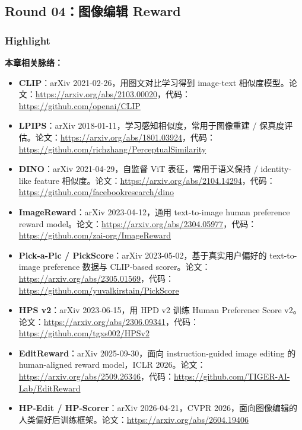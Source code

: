 
\subsection{Round 04：图像编辑 Reward}

\subsubsection{Highlight}

\begin{conceptbox}
\textbf{本章相关脉络：}
\begin{itemize}[leftmargin=1.5em]
  \item \textbf{CLIP}：arXiv 2021-02-26，用图文对比学习得到 image-text 相似度模型。论文：\url{https://arxiv.org/abs/2103.00020}，代码：\url{https://github.com/openai/CLIP}
  \item \textbf{LPIPS}：arXiv 2018-01-11，学习感知相似度，常用于图像重建 / 保真度评估。论文：\url{https://arxiv.org/abs/1801.03924}，代码：\url{https://github.com/richzhang/PerceptualSimilarity}
  \item \textbf{DINO}：arXiv 2021-04-29，自监督 ViT 表征，常用于语义保持 / identity-like feature 相似度。论文：\url{https://arxiv.org/abs/2104.14294}，代码：\url{https://github.com/facebookresearch/dino}
  \item \textbf{ImageReward}：arXiv 2023-04-12，通用 text-to-image human preference reward model。论文：\url{https://arxiv.org/abs/2304.05977}，代码：\url{https://github.com/zai-org/ImageReward}
  \item \textbf{Pick-a-Pic / PickScore}：arXiv 2023-05-02，基于真实用户偏好的 text-to-image preference 数据与 CLIP-based scorer。论文：\url{https://arxiv.org/abs/2305.01569}，代码：\url{https://github.com/yuvalkirstain/PickScore}
  \item \textbf{HPS v2}：arXiv 2023-06-15，用 HPD v2 训练 Human Preference Score v2。论文：\url{https://arxiv.org/abs/2306.09341}，代码：\url{https://github.com/tgxs002/HPSv2}
  \item \textbf{EditReward}：arXiv 2025-09-30，面向 instruction-guided image editing 的 human-aligned reward model，ICLR 2026。论文：\url{https://arxiv.org/abs/2509.26346}，代码：\url{https://github.com/TIGER-AI-Lab/EditReward}
  \item \textbf{HP-Edit / HP-Scorer}：arXiv 2026-04-21，CVPR 2026，面向图像编辑的人类偏好后训练框架。论文：\url{https://arxiv.org/abs/2604.19406}
\end{itemize}
\end{conceptbox}

